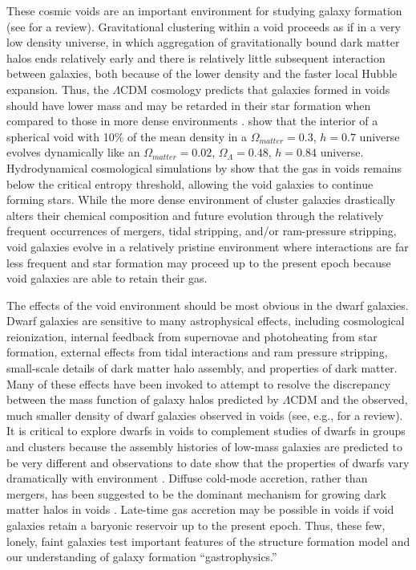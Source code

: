 
These cosmic voids are an important environment for studying galaxy formation 
(see \cite{vandeWeygaert11} for a review).  Gravitational clustering within a 
void proceeds as if in a very low density universe, in which aggregation of 
gravitationally bound dark matter halos ends relatively early and there is 
relatively little subsequent interaction between galaxies, both because of the 
lower density and the faster local Hubble expansion.  Thus, the $\Lambda$CDM 
cosmology predicts that galaxies formed in voids should have lower mass and may 
be retarded in their star formation when compared to those in more dense 
environments \citep[e.g.,][]{Gottlober03, Goldberg05, Cen11}.  \cite{Goldberg04} 
show that the interior of a spherical void with 10\% of the mean density in a 
$\Omega_{matter} = 0.3$, $h = 0.7$ universe evolves dynamically like an 
$\Omega_{matter} = 0.02$, $\Omega_{\Lambda} = 0.48$, $h = 0.84$ universe.  
Hydrodynamical cosmological simulations by \cite{Cen11} show that the gas in 
voids remains below the critical entropy threshold, allowing the void galaxies 
to continue forming stars.  While the more dense environment of cluster galaxies 
drastically alters their chemical composition and future evolution through the 
relatively frequent occurrences of mergers, tidal stripping, and/or ram-pressure 
stripping, void galaxies evolve in a relatively pristine environment where 
interactions are far less frequent and star formation may proceed up to the 
present epoch because void galaxies are able to retain their gas.

 
The effects of the void environment should be most obvious in the dwarf 
galaxies.  Dwarf galaxies are sensitive to many astrophysical effects, including 
cosmological reionization, internal feedback from supernovae and photoheating 
from star formation, external effects from tidal interactions and ram pressure 
stripping, small-scale details of dark matter halo assembly, and properties of 
dark matter. Many of these effects have been invoked to attempt to resolve the 
discrepancy between the mass function of galaxy halos predicted by $\Lambda$CDM 
and the observed, much smaller density of dwarf galaxies observed in voids (see, 
e.g., \cite{Kravtsov09} for a review).  It is critical to explore dwarfs in 
voids to complement studies of dwarfs in groups and clusters because the 
assembly histories of low-mass galaxies are predicted to be very different 
\citep[e.g.,][]{Gao07, Lackner12} and observations to date show that the 
properties of dwarfs vary dramatically with environment \citep[e.g.,][]{Ann08, 
Geha12}.  Diffuse cold-mode accretion, rather than mergers, has been suggested 
to be the dominant mechanism for growing dark matter halos in voids 
\citep[e.g.,][]{Keres05, Fakhouri09}.  Late-time gas accretion may be possible 
in voids if void galaxies retain a baryonic reservoir up to the present epoch.  
Thus, these few, lonely, faint galaxies test important features of the structure 
formation model and our understanding of galaxy formation ``gastrophysics.''

